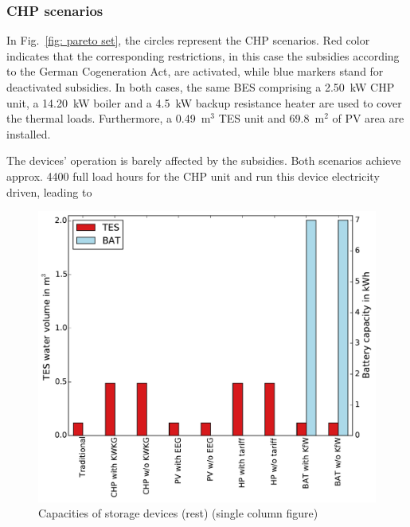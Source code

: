 \subsubsection{CHP scenarios}
In Fig.~\ref{fig: pareto set}, the circles represent the CHP scenarios.
Red color indicates that the corresponding restrictions, in this case the subsidies according to the German Cogeneration Act, are activated, while blue markers stand for deactivated subsidies.
In both cases, the same BES comprising a 2.50~kW CHP unit, a 14.20~kW boiler and a 4.5~kW backup resistance heater are used to cover the thermal loads.
Furthermore, a 0.49~m$^3$ TES unit and 69.8~m$^2$ of PV area are installed.

The devices' operation is barely affected by the subsidies.
Both scenarios achieve approx. 4400 full load hours for the CHP unit and run this device electricity driven, leading to 



\begin{figure}[h!]
	\begin{center}
		\includegraphics[width=\linewidth]{figures/plot_cap_sto_other.pdf}
		\caption{Capacities of storage devices (rest) (single column figure)}
		\label{fig: cap storage other}
	\end{center}
\end{figure}



